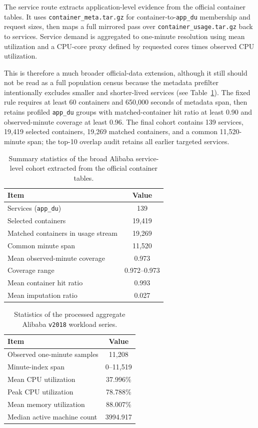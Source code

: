 The service route extracts application-level evidence from the official container tables. It uses \texttt{container\_meta.tar.gz} for container-to-\texttt{app\_du} membership and request sizes, then maps a full mirrored pass over \texttt{container\_usage.tar.gz} back to services. Service demand is aggregated to one-minute resolution using mean utilization and a CPU-core proxy defined by requested cores times observed CPU utilization.

This is therefore a much broader official-data extension, although it still should not be read as a full population census because the metadata prefilter intentionally excludes smaller and shorter-lived services (see Table~\ref{tab:service-cohort-stats}). The fixed rule requires at least 60 containers and 650{,}000 seconds of metadata span, then retains profiled \texttt{app\_du} groups with matched-container hit ratio at least 0.90 and observed-minute coverage at least 0.96. The final cohort contains 139 services, 19{,}419 selected containers, 19{,}269 matched containers, and a common 11{,}520-minute span; the top-10 overlap audit retains all earlier targeted services.

\begin{table}[htbp]
  \centering
  \caption{Summary statistics of the broad Alibaba service-level cohort extracted from the official container tables.}
  \label{tab:service-cohort-stats}
  \small
  \begin{tabular}{lc}
    \toprule
    Item & Value \\
    \midrule
    Services (\texttt{app\_du}) & 139 \\
    Selected containers & 19{,}419 \\
    Matched containers in usage stream & 19{,}269 \\
    Common minute span & 11{,}520 \\
    Mean observed-minute coverage & 0.973 \\
    Coverage range & 0.972--0.973 \\
    Mean container hit ratio & 0.993 \\
    Mean imputation ratio & 0.027 \\
    \bottomrule
  \end{tabular}
\end{table}

\begin{table}[htbp]
  \centering
  \caption{Statistics of the processed aggregate Alibaba \texttt{v2018} workload series.}
  \label{tab:dataset-stats}
  \begin{tabular}{lc}
    \toprule
    Item & Value \\
    \midrule
    Observed one-minute samples & 11{,}208 \\
    Minute-index span & 0--11{,}519 \\
    Mean CPU utilization & 37.996\% \\
    Peak CPU utilization & 78.788\% \\
    Mean memory utilization & 88.007\% \\
    Median active machine count & 3994.917 \\
    \bottomrule
  \end{tabular}
\end{table}


